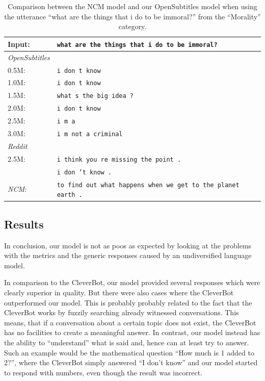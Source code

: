 \begin{table}[H]
	\centering
	\begin{adjustbox}{max width=\textwidth}
		\begin{tabularx}{\textwidth}{lX}
			\toprule
			Input: 	& \texttt{what are the things that i do to be immoral?}\\
			\midrule
			\emph{OpenSubtitles}\\
			0.5M: 	& \texttt{i don t know}\\
			1.0M: 	& \texttt{i don t know}\\
			1.5M:	& \texttt{what s the big idea ?}\\
			2.0M:	& \texttt{i don t know}\\
			2.5M:	& \texttt{i m a}\\
			3.0M:	& \texttt{i m not a criminal}\\
			\midrule
			\emph{Reddit}\\
			2.5M:	& \texttt{i think you re missing the point .}\\
			& \texttt{i don ’t know .}\\
			\midrule
			\emph{NCM}:	& \texttt{to find out what happens when we get to the planet earth .}\\
			\bottomrule
		\end{tabularx}
	\end{adjustbox}
	\caption{Comparison between the NCM model and our OpenSubtitles model when using the utterance ``what are the things that i do to be immoral?'' from the ``Morality'' category.}
	\label{results:example14_output:Neural_Conversational_Model_compared}
\end{table}

\subsection{Results}
In conclusion, our model is not as poos as expected by looking at the problems with the metrics and the generic responses caused by an undiversified language model.

In comparison to the CleverBot, our model provided several responses which were clearly superior in quality. But there were also cases where the CleverBot outperformed our model. This is probably probably related to the fact that the CleverBot works by fuzzily searching already witnessed conversations. This means, that if a conversation about a certain topic does not exist, the CleverBot has no facilities to create a meaningful answer. In contrast, our model instead has the ability to ``understand'' what is said and, hence can at least try to answer. Such an example would be the mathematical question ``How much is 1 added to 2?'', where the CleverBot simply answered ``I don't know'' and our model started to respond with numbers, even though the result was incorrect.

